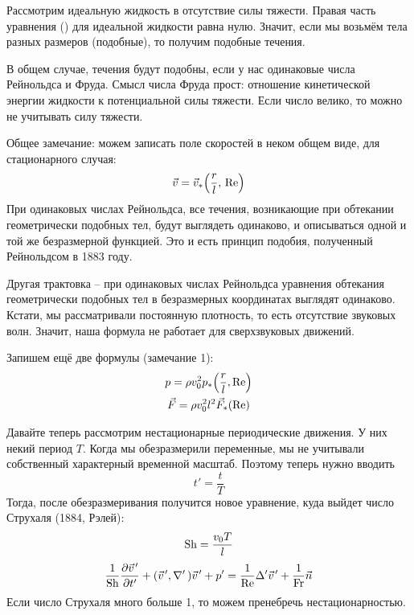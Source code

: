 Рассмотрим идеальную жидкость в отсутствие силы тяжести. Правая часть уравнения () для идеальной жидкости равна нулю. Значит, если мы возьмём тела разных размеров (подобные), то получим подобные течения.

В общем случае, течения будут подобны, если у нас одинаковые числа
Рейнольдса и Фруда. Смысл числа Фруда прост: отношение кинетической энергии жидкости к потенциальной силы тяжести. Если число велико, то можно не учитывать силу тяжести.

Общее замечание: можем записать поле скоростей в неком общем виде, для стационарного случая:
\begin{equation}
    \vec{v}=\vec{v}_* \qty(\frac{r}{l},\, \Re)
\end{equation}
При одинаковых числах Рейнольдса, все течения, возникающие при обтекании геометрически подобных тел, будут выглядеть одинаково, и описываться одной и той же безразмерной функцией. Это и есть принцип подобия, полученный Рейнольдсом в 1883 году.

Другая трактовка -- при одинаковых числах Рейнольдса уравнения обтекания геометрически подобных тел в безразмерных координатах выглядят одинаково.
Кстати, мы рассматривали постоянную плотность, то есть отсутствие звуковых волн. Значит, наша формула не работает для сверхзвуковых движений.

Запишем ещё две формулы (замечание 1):
\begin{gather}
    p = \rho v_0^2 p_* \qty(\frac{r}{l}, \Re) \\
    \vec{F} = \rho v_0^2 l^2 \vec{F}_* (\Re) 
\end{gather}

Давайте теперь рассмотрим нестационарные периодические движения. У них некий период $T$. Когда мы обезразмерили переменные, мы не учитывали собственный характерный временной масштаб. Поэтому теперь нужно вводить
\begin{equation}
    t'=\frac{t}{T}
\end{equation}
Тогда, после обезразмеривания получится новое уравнение, куда выйдет число Струхаля (1884, Рэлей):
\begin{equation}
    \operatorname{Sh} = \frac{v_0 T}{l}
\end{equation}
\begin{equation}
    \frac{1}{\Sh}\pdv{\pvec{v}'}{t'}+(\pvec{v}', \nabla'\,)\pvec{v}' + p'=
    \frac{1}{\Re}\Delta' \pvec{v}' + \frac{1}{\Fr} \vec{n}
\end{equation}
Если число Струхаля много больше 1, то можем пренебречь нестационарностью. 

